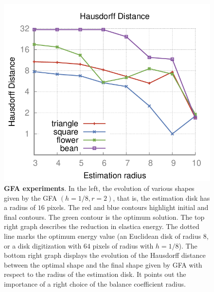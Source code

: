 \documentclass[review]{siamart220329}
\begin{document}
\begin{figure}
\begin{minipage}{0.75\textwidth}
\includegraphics[scale=0.22]{figures/hausdorff-distance/hausdorff-distance-plot.png}
\end{minipage}
\caption{\textbf{GFA experiments}. In the left, the evolution of various
shapes given by the GFA $(h=1/8,r=2)$, that is, the estimation disk has a
radius of $16$ pixels. The red and blue contours highlight initial and final
contours. The green contour is the optimum solution. The top right graph
describes the reduction in elastica energy. The dotted line marks the
optimum energy value (an Euclidean disk of radius $8$, or a disk
digitization with $64$ pixels of radius with $h=1/8$). The bottom right
graph displays the evolution of the Hausdorff distance
between the optimal shape and the final shape given by GFA with respect to 
the radius of the estimation disk. It points out the importance of a 
right choice of the balance coefficient radius.}
\label{fig:graph-flow-experiments}
\end{figure}
\end{document}
